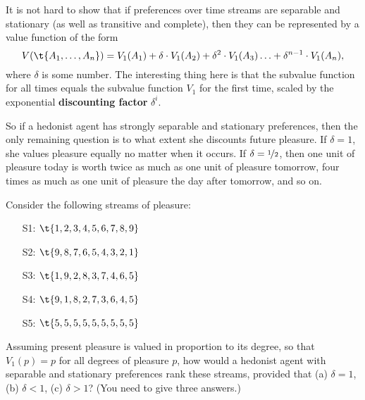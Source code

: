 It is not hard to show that if preferences over time streams are
separable and stationary (as well as transitive and complete), then
they can be represented by a value function of the form
\[
V(\t{A_1,\ldots,A_n}) = V_1(A_1) + \delta \cdot V_1(A_2) +
\delta^2 \cdot V_1(A_3) \ldots + \delta^{n-1} \cdot V_1(A_n),
\]
where $\delta$ is some number. The interesting thing here is that the
subvalue function for all times equals the subvalue function $V_1$ for
the first time, scaled by the exponential \textbf{discounting factor}
$\delta^i$.


So if a hedonist agent has strongly separable and stationary
preferences, then the only remaining question is to what extent she
discounts future pleasure. If $\delta = 1$, she values pleasure
equally no matter when it occurs. If $\delta = \nicefrac{1}{2}$, then
one unit of pleasure today is worth twice as much as one unit of
pleasure tomorrow, four times as much as one unit of pleasure the day
after tomorrow, and so on. 

\begin{exercise1}
  Consider the following streams of pleasure:
  \begin{enumerate}
    \itemsep-0.3em 
  \item[S1:] $\t{1,2,3,4,5,6,7,8,9}$ 
  \item[S2:] $\t{9,8,7,6,5,4,3,2,1}$
  \item[S3:] $\t{1,9,2,8,3,7,4,6,5}$ 
  \item[S4:] $\t{9,1,8,2,7,3,6,4,5}$ 
  \item[S5:] $\t{5,5,5,5,5,5,5,5,5}$
  \end{enumerate}
  Assuming present pleasure is valued in proportion to its degree, so
  that $V_1(p) = p$ for all degrees of pleasure $p$, how would a
  hedonist agent with separable and stationary preferences rank these
  streams, provided that (a) $\delta = 1$, (b)
  $\delta < 1$, (c) $\delta > 1$? (You need to give three answers.)
\end{exercise1}

